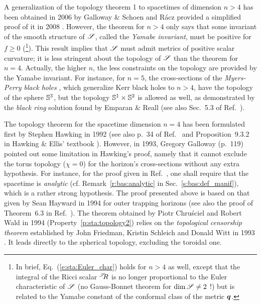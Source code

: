 A generalization of the topology theorem 1 to spacetimes of
dimension $n>4$ has been obtained in 2006 by Galloway \& Schoen \cite{GalloS06}
and R\'acz provided a simplified
proof of it in 2008 \cite{Racz08}.
However, the theorem for $n>4$ only says that some invariant
of the smooth structure of $\mathscr{S}$, called the
\emph{Yamabe invariant}, must be positive for
$f \geq 0$ (\footnote{In brief, Eq.~(\ref{e:sta:Euler_char}) holds for $n>4$
as well, except that the integral of the Ricci scalar ${}^{\mathscr{S}}\!\!R$ is no longer
proportional to the Euler characteristic of $\mathscr{S}$ (no Gauss-Bonnet theorem for $\mathrm{dim}\, \mathscr{S} \neq 2$ !) but is related to the Yamabe constant of the conformal class of the metric $\bm{q}$.}). This result implies that $\mathscr{S}$ must admit metrics of positive scalar curvature; it is
less stringent about the topology of $\mathscr{S}$ than the theorem for $n=4$.
Actually, the higher $n$, the less constraints on
the topology are provided by the Yamabe invariant. For instance,
for $n=5$, the cross-sections of the \emph{Myers-Perry black holes} \cite{MyersP86,EmparR08,Reall14}, which generalize
Kerr black holes to $n>4$, have the
topology of the sphere $\mathbb{S}^3$, but the topology
$\mathbb{S}^1\times\mathbb{S}^2$ is allowed as well, as demonstrated
by the \emph{black ring} solution found by Emparan \& Reall \cite{EmparR02,EmparR08,Reall14} (see also Sec.~5.3 of Ref.~\cite{Chrus20}).


\begin{hist}
The topology theorem for the spacetime dimension $n=4$ has been formulated
first by Stephen Hawking in 1992 \cite{Hawki72}
(see also p.~34 of Ref.~\cite{Hawki73} and Proposition~9.3.2 in Hawking \& Ellis' textbook
\cite{HawkiE73}).
However, in 1993, Gregory Galloway \cite{Gallo94} (p.~119)
pointed out some limitation in Hawking's proof, namely that it cannot
exclude the torus topology ($\chi = 0$) for the horizon's cross-sections
without any extra hypothesis. For instance, for the proof given in Ref.~\cite{Hawki72},
one shall require that the spacetime is \emph{analytic} (cf. Remark~\ref{r:bas:analytic}
in Sec.~\ref{s:bas:def_manif}), which is a rather strong hypothesis.
The proof presented above is based on that given
by Sean Hayward in 1994 \cite{Haywa94}
for outer trapping horizons (see also the proof of Theorem~6.3 in Ref.~\cite{Newma87}).
The theorem obtained by Piotr Chru\'sciel
and Robert Wald in 1994 \cite{ChrusW94b}
(Property~\ref{p:sta:topology2})
relies on the \emph{topological censorship theorem} established by
John Friedman, Kristin Schleich
and Donald Witt in 1993 \cite{FriedSW93}.
It leads directly to the spherical topology, excluding the toroidal one.
\end{hist}

